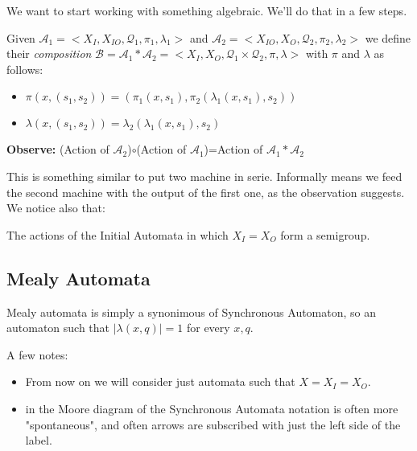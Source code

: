 \documentclass[mat1]{fmfdeloTS}
\newcommand{\auto}{\mathcal{A}}
\newcommand{\QQ}{\mathcal{Q}}
\begin{document}

We want to start working with something algebraic. We'll do that in a few steps.
\begin{definition}
Given $\auto_1=<X_I,X_{IO},\QQ_1,\pi_1,\lambda_1>$ and $\auto_2=<X_{IO},X_O,\QQ_2,\pi_2,\lambda_2> $ we define their \emph{composition} $\mathcal{B}=\auto_1*\auto_2=<X_I,X_O,\QQ_1\times\QQ_2,\pi,\lambda>$ with $\pi$ and $\lambda$ as follows:
\begin{itemize}
\item $\pi(x,(s_1,s_2))=(\pi_1(x,s_1),\pi_2(\lambda_1(x,s_1),s_2))$
\item $\lambda(x,(s_1,s_2))=\lambda_2(\lambda_1(x,s_1),s_2)$
\end{itemize}
\textbf{Observe:}
(Action of $\auto_2$)$\circ$(Action of $\auto_1$)=Action of $\auto_1*\auto_2$
\end{definition}
This is something similar to put two machine in serie. Informally means we feed the second machine with the output of the first one, as the observation suggests. We notice also that:

\begin{proposition}
The actions of the Initial Automata in which $X_I=X_O$ form a semigroup.
\end{proposition}



\subsection{Mealy Automata}

Mealy automata is simply a synonimous of Synchronous Automaton, so an automaton such that $|\lambda(x,q)|=1$ for every $x,q$. 

A few notes:
\begin{itemize}
\item From now on we will consider just automata such that $X=X_I=X_O$.
\item in the Moore diagram of the Synchronous Automata notation is often more "spontaneous", and often arrows are subscribed with just the left side of the label.
\end{itemize}
\end{document}
